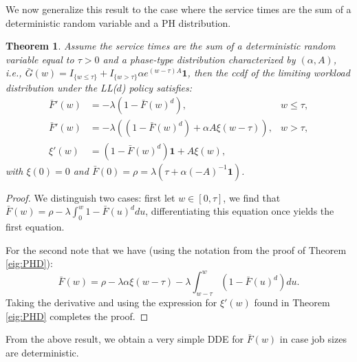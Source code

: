 \documentclass[12pt]{report}
\newtheorem{theorem}{Theorem}
\begin{document}
We now generalize this result to the case where the service times 
are the sum of a deterministic random variable and a PH distribution.

\begin{theorem}\label{th:X+PH}
Assume the service times are the sum of a deterministic random variable equal to $\tau > 0$ and
a phase-type distribution characterized by $(\alpha,A)$,
i.e., $\bar{G}(w) = I_{\{w\leq \tau\}} + I_{\{w > \tau\}} \alpha e^{(w-\tau) A} \textbf{1}$,
then the ccdf of the limiting workload distribution under the LL($d$) policy satisfies:
\begin{align*}
\bar{F}'(w) &= -\lambda(1-\bar{F}(w)^d), & w \leq \tau,\\
\bar{F}'(w) &= -\lambda((1 - \bar{F}(w)^d) +\alpha A \xi(w-\tau)), & w > \tau,\\
\xi'(w) & = (1-\bar{F}(w)^d) \textbf{1} + A \xi(w),
\end{align*}
with $\xi(0) = 0$ and $\bar{F}(0) = \rho = \lambda (\tau + \alpha(-A)^{-1}\textbf{1})$.
\end{theorem}
\begin{proof}
We distinguish two cases: first let $w \in [0,\tau]$, we find that $\bar{F}(w) = \rho - \lambda \int_0^w 1 - \bar{F}(u)^d du$, differentiating this equation once yields the first equation.

For the second note that we have (using the notation from the proof of Theorem \ref{eig:PHD}):
$$
\bar{F}(w) = \rho - \lambda \alpha \xi(w-\tau)  - \lambda \int_{w-\tau}^w (1-\bar{F}(u)^d) du.
$$
Taking the derivative and using the expression for $\xi'(w)$ found in Theorem \ref{eig:PHD} completes the proof.
\end{proof}
From the above result, we obtain a very simple DDE for $\bar F(w)$ in case job sizes are deterministic.
\end{document}
